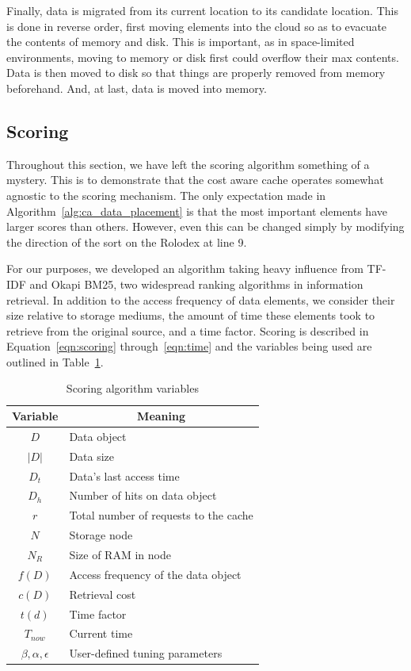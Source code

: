 Finally, data is migrated from its current location to its candidate location.
This is done in reverse order, first moving elements into the cloud so as to
evacuate the contents of memory and disk. This is important, as in
space-limited environments, moving to memory or disk first could overflow their
max contents. Data is then moved to disk so that things are properly removed
from memory beforehand. And, at last, data is moved into memory.

\subsection{Scoring} %
\label{sub:ca_scoring}
Throughout this section, we have left the scoring algorithm something of a
mystery. This is to demonstrate that the cost aware cache operates somewhat
agnostic to the scoring mechanism. The only expectation made in
Algorithm~\ref{alg:ca_data_placement} is that the most important elements have
larger scores than others. However, even this can be changed simply by
modifying the direction of the sort on the Rolodex at line 9.

For our purposes, we developed an algorithm taking heavy influence from TF-IDF
and Okapi BM25\cite{tfidf,bm25}, two widespread ranking algorithms in
information retrieval. In addition to the access frequency of data elements, we
consider their size relative to storage mediums, the amount of time these
elements took to retrieve from the original source, and a time factor. Scoring
is described in Equation~\ref{eqn:scoring} through~\ref{eqn:time} and the
variables being used are outlined in Table~\ref{tab:scoring_variables}.

\begin{table}[htp]
  \begin{center}
    \begin{tabular}{|c|l|}
      \hline
      \multicolumn{1}{|c}{\textbf{Variable}} &
      \multicolumn{1}{|c|}{\textbf{Meaning}}\\
      \hline
				$D$ & Data object\\
				$|D|$ & Data size\\
				$D_t$ & Data's last access time\\
				$D_h$ & Number of hits on data object\\
				$r$ & Total number of requests to the cache\\
				$N$ & Storage node\\
				$N_R$ & Size of RAM in node\\
				$f(D)$ & Access frequency of the data object\\
				$c(D)$ & Retrieval cost\\
				$t(d)$ & Time factor\\
				$T_{now}$ & Current time\\
				$\beta,\alpha,\epsilon$ & User-defined tuning parameters\\
      \hline
    \end{tabular}
    \caption{Scoring algorithm variables}
    \label{tab:scoring_variables}
  \end{center}
\end{table}

